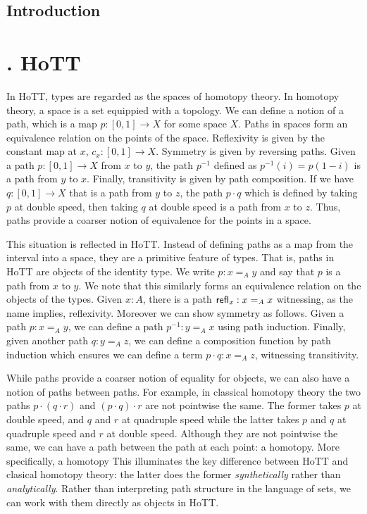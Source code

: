 \documentclass{article}
\theoremstyle{named}
\theoremstyle{remark}
\theoremstyle{definition}
\begin{document}
\newpage 
\subsection*{\centering Introduction}

\newpage
\section*{. HoTT}
In HoTT, types are regarded as the spaces of homotopy theory. In homotopy theory, a space is a set equippied with a topology. We can define a notion of a path, which is a map $p : [0,1] \to X$ for some space $X$. Paths in spaces form an equivalence relation on the points of the space. Reflexivity is given by the constant map at $x$, $c_x : [0,1] \to X$. Symmetry is given by reversing paths. Given a path $p : [0,1] \to X$ from $x$ to $y$, the path $p^{-1}$ defined as $p^{-1}(i)=p(1-i)$ is a path from $y$ to $x$. Finally, transitivity is given by path composition. If we have $q : [0,1] \to X$ that is a path from $y$ to $z$, the path $p \cdot q$ which is defined by taking $p$ at double speed, then taking $q$ at double speed is a path from $x$ to $z$. Thus, paths provide a coarser notion of equivalence for the points in a space.

This situation is reflected in HoTT. Instead of defining paths as a map from the interval into a space, they are a primitive feature of types. That is, paths in HoTT are objects of the identity type. We write $p : x =_A y$ and say that $p$ is a path from $x$ to $y$. We note that this similarly forms an equivalence relation on the objects of the types. Given $x : A$, there is a path $\mathsf{refl}_{x} : x=_A x$ witnessing, as the name implies, reflexivity. Moreover we can show symmetry as follows. Given a path $p : x=_A y$, we can define a path $p^{-1} : y =_A x$ using path induction. Finally, given another path $q : y =_A z$, we can define a composition function by path induction which ensures we can define a term $p \cdot q : x =_A z$, witnessing transitivity.

While paths provide a coarser notion of equality for objects, we can also have a notion of paths between paths. For example, in classical homotopy theory the two paths $p \cdot (q \cdot r)$ and $(p \cdot q ) \cdot r$ are not pointwise the same. The former takes $p$ at double speed, and $q$ and $r$ at quadruple speed while the latter takes $p$ and $q$ at quadruple speed and $r$ at double speed. Although they are not pointwise the same, we can have a path between the path at each point: a homotopy. More specifically, a homotopy
This illuminates the key difference between HoTT and clasical homotopy theory: the latter does the former \textit{synthetically} rather than \textit{analytically}. Rather than interpreting path structure in the language of sets, we can work with them directly as objects in HoTT. 
\end{document}
